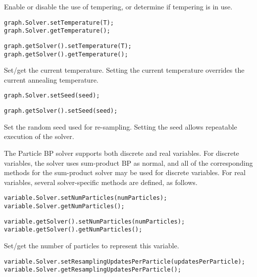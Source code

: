 Enable or disable the use of tempering, or determine if tempering is in use.

\ifmatlab
\begin{lstlisting}
graph.Solver.setTemperature(T);
graph.Solver.getTemperature();
\end{lstlisting}
\fi

\ifjava
\begin{lstlisting}
graph.getSolver().setTemperature(T);
graph.getSolver().getTemperature();
\end{lstlisting}
\fi

Set/get the current temperature. Setting the current temperature overrides the current annealing temperature.

\ifmatlab
\begin{lstlisting}
graph.Solver.setSeed(seed);
\end{lstlisting}
\fi

\ifjava
\begin{lstlisting}
graph.getSolver().setSeed(seed);
\end{lstlisting}
\fi

Set the random seed used for re-sampling. Setting the seed allows repeatable execution of the solver.


The Particle BP solver supports both discrete and real variables. For discrete variables, the solver uses sum-product BP as normal, and all of the corresponding methods for the sum-product solver may be used for discrete variables. For real variables, several solver-specific methods are defined, as follows.

\label{sec:ParticleBPRealVariableSpecificMethods}

\ifmatlab
\begin{lstlisting}
variable.Solver.setNumParticles(numParticles);
variable.Solver.getNumParticles();
\end{lstlisting}
\fi

\ifjava
\begin{lstlisting}
variable.getSolver().setNumParticles(numParticles);
variable.getSolver().getNumParticles();
\end{lstlisting}
\fi

Set/get the number of particles to represent this variable.

\ifmatlab
\begin{lstlisting}
variable.Solver.setResamplingUpdatesPerParticle(updatesPerParticle);
variable.Solver.getResamplingUpdatesPerParticle();
\end{lstlisting}
\fi

